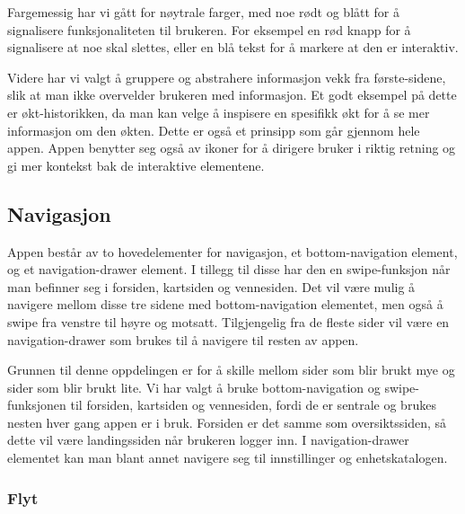 Fargemessig har vi gått for nøytrale farger, med noe rødt og blått for å signalisere funksjonaliteten til brukeren. For eksempel en rød knapp for å signalisere at noe skal slettes, eller en blå tekst for å markere at den er interaktiv.

Videre har vi valgt å gruppere og abstrahere informasjon vekk fra første-sidene, slik at man ikke overvelder brukeren med informasjon. Et godt eksempel på dette er økt-historikken, da man kan velge å inspisere en spesifikk økt for å se mer informasjon om den økten. Dette er også et prinsipp som går gjennom hele appen. Appen benytter seg også av ikoner for å dirigere bruker i riktig retning og gi mer kontekst bak de interaktive elementene.

\subsection{Navigasjon}
Appen består av to hovedelementer for navigasjon, et bottom-navigation element, og et navigation-drawer element. I tillegg til disse har den en swipe-funksjon når man befinner seg i forsiden, kartsiden og vennesiden. Det vil være mulig å navigere mellom disse tre sidene med bottom-navigation elementet, men også å swipe fra venstre til høyre og motsatt. Tilgjengelig fra de fleste sider vil være en navigation-drawer som brukes til å navigere til resten av appen.

Grunnen til denne oppdelingen er for å skille mellom sider som blir brukt mye og sider som blir brukt lite. Vi har valgt å bruke bottom-navigation og swipe-funksjonen til forsiden, kartsiden og vennesiden, fordi de er sentrale og brukes nesten hver gang appen er i bruk. Forsiden er det samme som oversiktssiden, så dette vil være landingssiden når brukeren logger inn. I navigation-drawer elementet kan man blant annet navigere seg til innstillinger og enhetskatalogen.

    \subsubsection{Flyt}

